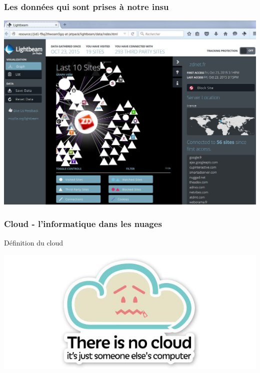 \documentclass{beamer}
\begin{document}
\begin{frame}
\frametitle{Les données qui sont prises à notre insu}
\includegraphics[scale=0.45] {./images/Lightbeam.jpg} 
\end{frame}

\begin{frame}
\frametitle{Cloud - l'informatique dans les nuages}
\begin{block}{Définition du cloud}
\begin{center}
\includegraphics[scale=0.5] {./images/cloud.png} 
\end{center}
\end{block}
\end{frame}
\end{document}
